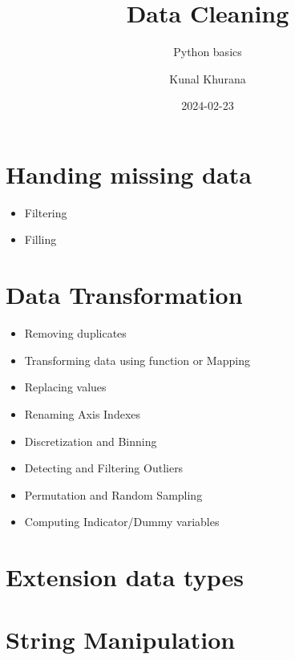 \documentclass[
  letterpaper,
  DIV=11,
  numbers=noendperiod]{scrreprt}
\title{Data Cleaning}
\subtitle{Python basics}
\author{Kunal Khurana}
\date{2024-02-23}
\providecommand{\tightlist}{%
  \setlength{\itemsep}{0pt}\setlength{\parskip}{0pt}}\usepackage{longtable,booktabs,array}
\renewcommand*\contentsname{Table of contents}
\newcommand\contentsname{Table of contents}
\begin{document}
\maketitle
\ifdefined\Shaded\renewenvironment{Shaded}{\begin{tcolorbox}[sharp corners, frame hidden, breakable, boxrule=0pt, borderline west={3pt}{0pt}{shadecolor}, interior hidden, enhanced]}{\end{tcolorbox}}\fi

\renewcommand*\contentsname{Table of contents}
{
\hypersetup{linkcolor=}
\setcounter{tocdepth}{2}
\tableofcontents
}
\hypertarget{handing-missing-data}{%
\section{Handing missing data}\label{handing-missing-data}}

\begin{itemize}
\tightlist
\item
  Filtering
\item
  Filling
\end{itemize}

\hypertarget{data-transformation}{%
\section{Data Transformation}\label{data-transformation}}

\begin{itemize}
\tightlist
\item
  Removing duplicates
\item
  Transforming data using function or Mapping
\item
  Replacing values
\item
  Renaming Axis Indexes
\item
  Discretization and Binning
\item
  Detecting and Filtering Outliers
\item
  Permutation and Random Sampling
\item
  Computing Indicator/Dummy variables
\end{itemize}

\hypertarget{extension-data-types}{%
\section{Extension data types}\label{extension-data-types}}

\hypertarget{string-manipulation}{%
\section{String Manipulation}\label{string-manipulation}}
\end{document}
